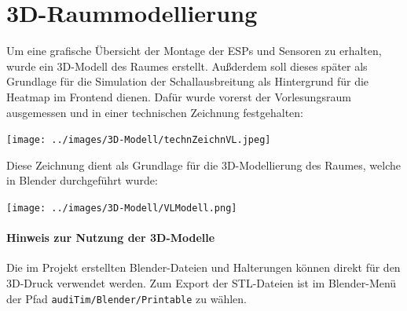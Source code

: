 \section{3D-Raummodellierung}
Um eine grafische Übersicht der Montage der ESPs und Sensoren zu erhalten, wurde ein 3D-Modell des Raumes erstellt.
Außderdem soll dieses später als Grundlage für die Simulation der Schallausbreitung als Hintergrund für die Heatmap im Frontend dienen.
Dafür wurde vorerst der Vorlesungsraum ausgemessen und in einer technischen Zeichnung festgehalten:
\begin{center}
  \texttt{[image: ../images/3D-Modell/technZeichnVL.jpeg]}
\end{center}
Diese Zeichnung dient als Grundlage für die 3D-Modellierung des Raumes, welche in Blender durchgeführt wurde:
\begin{center}
  \texttt{[image: ../images/3D-Modell/VLModell.png]}
\end{center}

\paragraph{Hinweis zur Nutzung der 3D-Modelle}  
Die im Projekt erstellten Blender-Dateien und Halterungen können direkt für den 3D-Druck verwendet werden.  
Zum Export der STL-Dateien ist im Blender-Menü der Pfad \texttt{audiTim/Blender/Printable} zu wählen.
